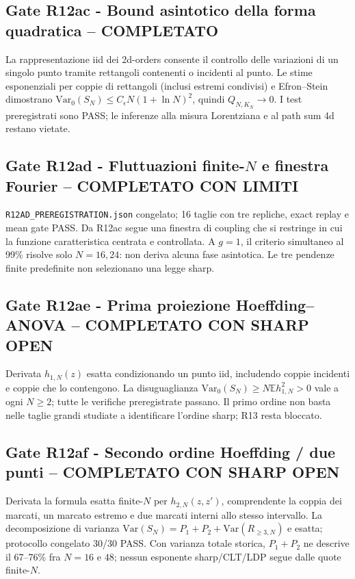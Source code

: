 \documentclass[11pt,a4paper]{article}
\begin{document}
\subsection*{Gate R12ac - Bound asintotico della forma quadratica -- COMPLETATO}
La rappresentazione iid dei 2d-orders consente il controllo delle variazioni di un singolo punto tramite rettangoli contenenti o incidenti al punto. Le stime esponenziali per coppie di rettangoli (inclusi estremi condivisi) e Efron--Stein dimostrano $\mathrm{Var}_0(S_N)\le C_\epsilon N(1+\ln N)^2$, quindi $Q_{N,K_N}\to0$. I test preregistrati sono PASS; le inferenze alla misura Lorentziana e al path sum 4d restano vietate.

\subsection*{Gate R12ad - Fluttuazioni finite-$N$ e finestra Fourier -- COMPLETATO CON LIMITI}
\texttt{R12AD\_PREREGISTRATION.json} congelato; 16 taglie con tre repliche, exact replay e mean gate PASS. Da R12ac segue una finestra di coupling che si restringe in cui la funzione caratteristica centrata e controllata. A $g=1$, il criterio simultaneo al 99\% risolve solo $N=16,24$: non deriva alcuna fase asintotica. Le tre pendenze finite predefinite non selezionano una legge sharp.

\subsection*{Gate R12ae - Prima proiezione Hoeffding--ANOVA -- COMPLETATO CON SHARP OPEN}
Derivata $h_{1,N}(z)$ esatta condizionando un punto iid, includendo coppie incidenti e coppie che lo contengono. La disuguaglianza $\mathrm{Var}_0(S_N)\ge N\mathbb E h_{1,N}^2>0$ vale a ogni $N\ge2$; tutte le verifiche preregistrate passano. Il primo ordine non basta nelle taglie grandi studiate a identificare l'ordine sharp; R13 resta bloccato.

\subsection*{Gate R12af - Secondo ordine Hoeffding / due punti -- COMPLETATO CON SHARP OPEN}
Derivata la formula esatta finite-$N$ per $h_{2,N}(z,z')$, comprendente la coppia dei marcati, un marcato estremo e due marcati interni allo stesso intervallo. La decomposizione di varianza $\mathrm{Var}(S_N)=P_1+P_2+\mathrm{Var}(R_{\ge3,N})$ e esatta; protocollo congelato 30/30 PASS. Con varianza totale storica, $P_1+P_2$ ne descrive il 67--76\% fra $N=16$ e $48$; nessun esponente sharp/CLT/LDP segue dalle quote finite-$N$.
\end{document}
